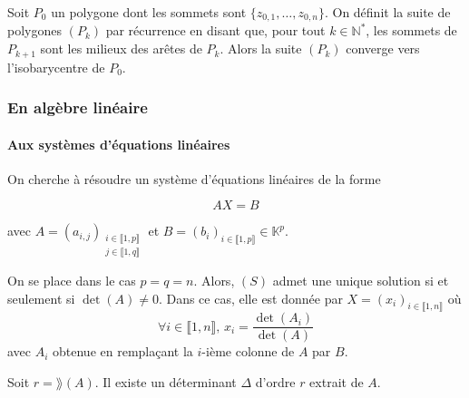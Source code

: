   \begin{theorem}
    Soit $P_0$ un polygone dont les sommets sont $\{ z_{0,1}, \dots, z_{0,n} \}$. On définit la suite de polygones $(P_k)$ par récurrence en disant que, pour tout $k \in \mathbb{N}^*$, les sommets de $P_{k+1}$ sont les milieux des arêtes de $P_k$.
    \newpar
    Alors la suite $(P_k)$ converge vers l'isobarycentre de $P_0$.
  \end{theorem}

  \subsubsection{En algèbre linéaire}

  \paragraph{Aux systèmes d'équations linéaires}


  On cherche à résoudre un système d'équations linéaires de la forme

  \[ AX = B \tag{S} \]

  avec $A = (a_{i,j})_{\substack{i \in \llbracket 1, p \rrbracket \\ j \in \llbracket 1, q \rrbracket}}$ et $B = (b_i)_{i \in \llbracket 1, p \rrbracket} \in \mathbb{K}^p$.

  \begin{theorem}
    On se place dans le cas $p = q = n$. Alors, $(S)$ admet une unique solution si et seulement si $\det(A) \neq 0$. Dans ce cas, elle est donnée par $X = (x_i)_{i \in \llbracket 1, n \rrbracket}$ où
    \[ \forall i \in \llbracket 1, n \rrbracket, \, x_i = \frac{\det(A_i)}{\det(A)} \]
    avec $A_i$ obtenue en remplaçant la $i$-ième colonne de $A$ par $B$.
  \end{theorem}

  \begin{lemma}
    Soit $r = \rang(A)$. Il existe un déterminant $\Delta$ d'ordre $r$ extrait de $A$.
  \end{lemma}

